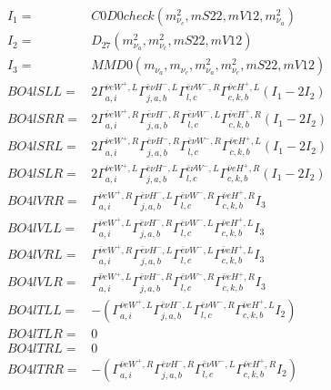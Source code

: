 \documentclass[A4,landscape]{article}
\begin{document}
\begin{align} 
I_1 = & C0D0check(m^2_{\nu_{{c}}}, mS22, mV12, m^2_{\nu_{{a}}}) \\ 
I_2 = & D_{27}(m^2_{\nu_{{a}}}, m^2_{\nu_{{c}}}, mS22, mV12) \\ 
I_3 = & MMD0(m_{\nu_{{a}}}, m_{\nu_{{c}}}, m^2_{\nu_{{a}}}, m^2_{\nu_{{c}}}, mS22, mV12) \\ 
  BO4lSLL= & 2  \Gamma^{\bar{\nu}e W^+,L}_{a, i} \Gamma^{\bar{e}\nu H^- ,L}_{j, a, b} \Gamma^{\bar{e}\nu W^- ,R}_{l, c} \Gamma^{\bar{\nu}e H^+,L}_{c, k, b} (I_1 - 2 I_2) \\ 
  BO4lSRR= & 2  \Gamma^{\bar{\nu}e W^+,R}_{a, i} \Gamma^{\bar{e}\nu H^- ,R}_{j, a, b} \Gamma^{\bar{e}\nu W^- ,L}_{l, c} \Gamma^{\bar{\nu}e H^+,R}_{c, k, b} (I_1 - 2 I_2) \\ 
  BO4lSRL= & 2  \Gamma^{\bar{\nu}e W^+,R}_{a, i} \Gamma^{\bar{e}\nu H^- ,R}_{j, a, b} \Gamma^{\bar{e}\nu W^- ,R}_{l, c} \Gamma^{\bar{\nu}e H^+,L}_{c, k, b} (I_1 - 2 I_2) \\ 
  BO4lSLR= & 2  \Gamma^{\bar{\nu}e W^+,L}_{a, i} \Gamma^{\bar{e}\nu H^- ,L}_{j, a, b} \Gamma^{\bar{e}\nu W^- ,L}_{l, c} \Gamma^{\bar{\nu}e H^+,R}_{c, k, b} (I_1 - 2 I_2) \\ 
  BO4lVRR= &  \Gamma^{\bar{\nu}e W^+,R}_{a, i} \Gamma^{\bar{e}\nu H^- ,L}_{j, a, b} \Gamma^{\bar{e}\nu W^- ,R}_{l, c} \Gamma^{\bar{\nu}e H^+,R}_{c, k, b} I_3 \\ 
  BO4lVLL= &  \Gamma^{\bar{\nu}e W^+,L}_{a, i} \Gamma^{\bar{e}\nu H^- ,R}_{j, a, b} \Gamma^{\bar{e}\nu W^- ,L}_{l, c} \Gamma^{\bar{\nu}e H^+,L}_{c, k, b} I_3 \\ 
  BO4lVRL= &  \Gamma^{\bar{\nu}e W^+,R}_{a, i} \Gamma^{\bar{e}\nu H^- ,L}_{j, a, b} \Gamma^{\bar{e}\nu W^- ,L}_{l, c} \Gamma^{\bar{\nu}e H^+,L}_{c, k, b} I_3 \\ 
  BO4lVLR= &  \Gamma^{\bar{\nu}e W^+,L}_{a, i} \Gamma^{\bar{e}\nu H^- ,R}_{j, a, b} \Gamma^{\bar{e}\nu W^- ,R}_{l, c} \Gamma^{\bar{\nu}e H^+,R}_{c, k, b} I_3 \\ 
  BO4lTLL= & -( \Gamma^{\bar{\nu}e W^+,L}_{a, i} \Gamma^{\bar{e}\nu H^- ,L}_{j, a, b} \Gamma^{\bar{e}\nu W^- ,R}_{l, c} \Gamma^{\bar{\nu}e H^+,L}_{c, k, b} I_2) \\ 
  BO4lTLR= & 0 \\ 
  BO4lTRL= & 0 \\ 
  BO4lTRR= & -( \Gamma^{\bar{\nu}e W^+,R}_{a, i} \Gamma^{\bar{e}\nu H^- ,R}_{j, a, b} \Gamma^{\bar{e}\nu W^- ,L}_{l, c} \Gamma^{\bar{\nu}e H^+,R}_{c, k, b} I_2) \\ 
\end{align} 
\end{document}
